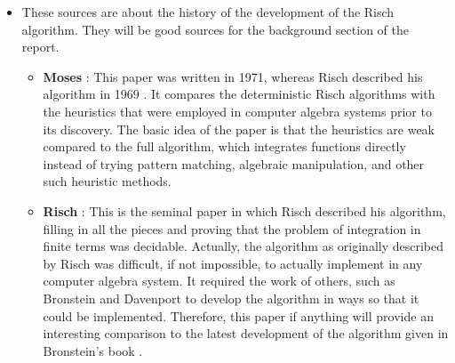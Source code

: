 \documentclass[12pt]{article}
\begin{document}
\begin{itemize}
\begin{itemize}
    \end{itemize}
\item These sources are about the history of the development of the
Risch algorithm.  They will be good sources for the background section
of the report.
    \begin{itemize}
    \item \textbf{Moses} \cite{moses1971symbolic}: This paper was
    written in 1971, whereas Risch described his algorithm in 1969
    \cite{risch1969problem}.  It compares the deterministic Risch
    algorithms with the heuristics that were employed in computer
    algebra systems prior to its discovery.  The basic idea of the paper
    is that the heuristics are weak compared to the full algorithm,
    which integrates functions directly instead of trying pattern
    matching, algebraic manipulation, and other such heuristic methods.

    \item \textbf{Risch} \cite{risch1969problem}: This is the seminal
    paper in which Risch described his algorithm, filling in all the
    pieces and proving that the problem of integration in finite terms
    was decidable.  Actually, the algorithm as originally described by
    Risch was difficult, if not impossible, to actually implement in any
    computer algebra system.  It required the work of others, such as
    Bronstein and Davenport \cite{davenport1984integration} to develop
    the algorithm in ways so that it could be implemented.  Therefore,
    this paper if anything will provide an interesting comparison to the
    latest development of the algorithm given in Bronstein's book
    \cite{bronstein2005symbolic}.
    \end{itemize}

\end{itemize}
\nocite{*}


\end{document}
